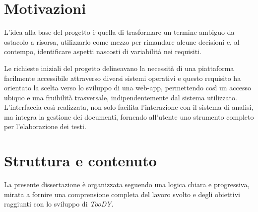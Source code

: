\documentclass[12pt]{report}
\newcommand{\toody}{\textsl{TooDY}\xspace}
\begin{document}
\section{Motivazioni}
L’idea alla base del progetto è quella di trasformare un termine ambiguo da ostacolo a risorsa, utilizzarlo come mezzo per rimandare alcune decisioni e, al contempo, identificare aspetti nascosti di variabilità nei requisiti.

Le richieste iniziali del progetto delineavano la necessità di una piattaforma facilmente accessibile attraverso diversi sistemi operativi e questo requisito ha orientato la scelta verso lo sviluppo di una web-app, permettendo così un accesso ubiquo e una fruibilità trasversale, indipendentemente dal sistema utilizzato. L'interfaccia così realizzata, non solo facilita l'interazione con il sistema di analisi, ma integra la gestione dei documenti, fornendo all'utente uno strumento completo per l'elaborazione dei testi.


\section{Struttura e contenuto}
La presente dissertazione è organizzata seguendo una logica chiara e progressiva, mirata a fornire una comprensione completa del lavoro svolto e degli obiettivi raggiunti con lo sviluppo di \toody.

\end{document}
